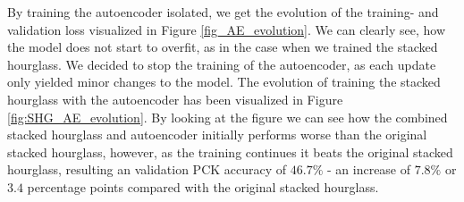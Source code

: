 \documentclass[./main.tex]{subfiles}
\begin{document}
\noindent By training the autoencoder isolated, we get the evolution of the training- and validation loss visualized in Figure \ref{fig_AE_evolution}. We can clearly see, how the model does not start to overfit, as in the case when we trained the stacked hourglass. We decided to stop the training of the autoencoder, as each update only yielded minor changes to the model. The evolution of training the stacked hourglass with the autoencoder has been visualized in Figure \ref{fig:SHG_AE_evolution}. By looking at the figure we can see how the combined stacked hourglass and autoencoder initially performs worse than the original stacked hourglass, however, as the training continues it beats the original stacked hourglass, resulting an validation PCK accuracy of $46.7\%$ - an increase of $7.8\%$ or $3.4$ percentage points compared with the original stacked hourglass.
\\
\\

\end{document}
